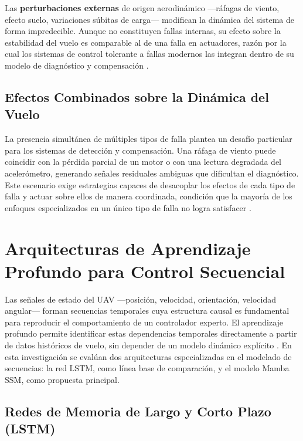 Las \textbf{perturbaciones externas} de origen aerodinámico —ráfagas de viento, efecto suelo, variaciones súbitas de carga— modifican la dinámica del sistema de forma impredecible. Aunque no constituyen fallas internas, su efecto sobre la estabilidad del vuelo es comparable al de una falla en actuadores, razón por la cual los sistemas de control tolerante a fallas modernos las integran dentro de su modelo de diagnóstico y compensación \cite{hsu2024, chen2023}.

\subsection{Efectos Combinados sobre la Dinámica del Vuelo}

La presencia simultánea de múltiples tipos de falla plantea un desafío particular para los sistemas de detección y compensación. Una ráfaga de viento puede coincidir con la pérdida parcial de un motor o con una lectura degradada del acelerómetro, generando señales residuales ambiguas que dificultan el diagnóstico. Este escenario exige estrategias capaces de desacoplar los efectos de cada tipo de falla y actuar sobre ellos de manera coordinada, condición que la mayoría de los enfoques especializados en un único tipo de falla no logra satisfacer \cite{fdd2021survey, quadcopter2024}.


\section{Arquitecturas de Aprendizaje Profundo para Control Secuencial}

Las señales de estado del UAV —posición, velocidad, orientación, velocidad angular— forman secuencias temporales cuya estructura causal es fundamental para reproducir el comportamiento de un controlador experto. El aprendizaje profundo permite identificar estas dependencias temporales directamente a partir de datos históricos de vuelo, sin depender de un modelo dinámico explícito \cite{ozcan2024, chen2023}. En esta investigación se evalúan dos arquitecturas especializadas en el modelado de secuencias: la red LSTM, como línea base de comparación, y el modelo Mamba SSM, como propuesta principal.

\subsection{Redes de Memoria de Largo y Corto Plazo (LSTM)}

